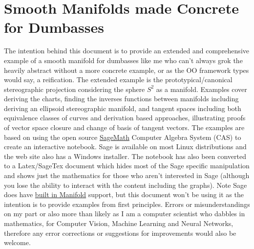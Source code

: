 \documentclass[11pt]{article}
\begin{document}
    
    
    \hypertarget{smooth-manifolds-made-concrete-for-dumbasses}{%
\section{Smooth Manifolds made Concrete for Dumbasses}\label{smooth-manifolds-made-concrete-for-dumbasses}}

The intention behind this document is to provide an extended and comprehensive example of a smooth
manifold for dumbasses like me who can't always grok the heavily abstract without a more concrete
example, or as the OO framework types would say, a reification. The extended example is the
prototypical/canonical stereographic projection considering the sphere \(S^2\) as a manifold.
Examples cover deriving the charts, finding the inverses functions between manifolds including
deriving an ellipsoid stereographic manifold, and tangent spaces including both equivalence classes
of curves and derivation based approaches, illustrating proofs of vector space closure and change
of basis of tangent vectors. The examples are based on using the open source
\href{https://www.sagemath.org/}{SageMath} Computer Algebra System (CAS) to create an interactive
notebook. Sage is available on most Linux distributions and the web site also has a Windows
installer. The notebook has also been converted to a Latex/SageTex document which hides most of
the Sage specific manipulation and shows just the mathematics for those who aren't interested in
Sage (although you lose the ability to interact with the content including the graphs).
Note Sage does have 
\href{http://doc.sagemath.org/html/en/reference/manifolds/sage/manifolds/differentiable/manifold.html}{built in Manifold}
support, but this document won't be using it as the intention is to provide examples from first principles.
Errors or misunderstandings on my part or also more than likely as I am a computer scientist who dabbles in mathematics,
for Computer Vision, Machine Learning and Neural Networks, therefore any error corrections or suggestions 
for improvements would also be welcome.
\end{document}
